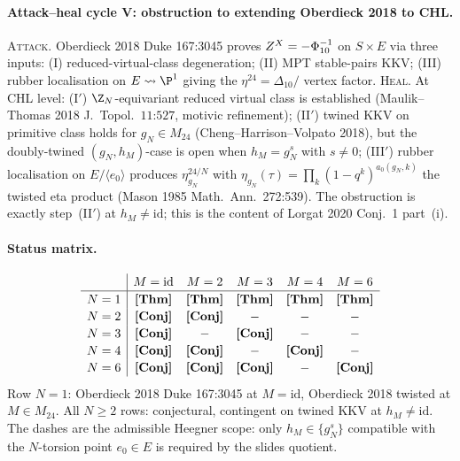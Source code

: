 \paragraph{Attack--heal cycle V: obstruction to extending Oberdieck 2018
to CHL.} \textsc{Attack.} Oberdieck 2018 Duke 167:3045 proves
$Z^{X}=-\Phi_{10}^{-1}$ on $S\times E$ via three inputs:
(I) reduced-virtual-class degeneration; (II) MPT stable-pairs KKV;
(III) rubber localisation on $E\rightsquigarrow\P^1$ giving the
$\eta^{24}=\Delta_{10}/$ vertex factor. \textsc{Heal.} At CHL level:
(I$'$) $\Z_N$-equivariant reduced virtual class is established
(Maulik--Thomas 2018 J.~Topol.~$11$:$527$, motivic refinement);
(II$'$) twined KKV on primitive class holds for $g_N\in M_{24}$
(Cheng--Harrison--Volpato 2018), but the doubly-twined
$(g_N,h_M)$-case is open when $h_M=g_N^s$ with $s\neq 0$;
(III$'$) rubber localisation on $E/\langle e_0\rangle$ produces
$\eta_{g_N}^{24/N}$ with $\eta_{g_N}(\tau)=\prod_k(1-q^k)^{a_0(g_N,k)}$
the twisted eta product (Mason 1985 Math.~Ann.~272:539). The
obstruction is exactly step~(II$'$) at $h_M\neq\mathrm{id}$; this is
the content of Lorgat 2020 Conj.~1 part~(i).

\paragraph{Status matrix.}
\[
\renewcommand{\arraystretch}{1.15}
\begin{array}{c|ccccc}
 & M=\mathrm{id} & M=2 & M=3 & M=4 & M=6\\ \hline
 N=1 & \text{\ClaimStatusTheorem} & \text{\ClaimStatusTheorem} & \text{\ClaimStatusTheorem} & \text{\ClaimStatusTheorem} & \text{\ClaimStatusTheorem}\\
 N=2 & \text{\ClaimStatusConjectured} & \text{\ClaimStatusConjectured} & - & - & -\\
 N=3 & \text{\ClaimStatusConjectured} & - & \text{\ClaimStatusConjectured} & - & -\\
 N=4 & \text{\ClaimStatusConjectured} & \text{\ClaimStatusConjectured} & - & \text{\ClaimStatusConjectured} & -\\
 N=6 & \text{\ClaimStatusConjectured} & \text{\ClaimStatusConjectured} & \text{\ClaimStatusConjectured} & - & \text{\ClaimStatusConjectured}\\
\end{array}
\]
Row $N=1$: Oberdieck 2018 Duke 167:3045 at $M=\mathrm{id}$, Oberdieck
2018 twisted at $M\in M_{24}$. All $N\geq 2$ rows: conjectural,
contingent on twined KKV at $h_M\neq\mathrm{id}$. The dashes are the
admissible Heegner scope: only $h_M\in\{g_N^s\}$ compatible with the
$N$-torsion point $e_0\in E$ is required by the slides quotient.

